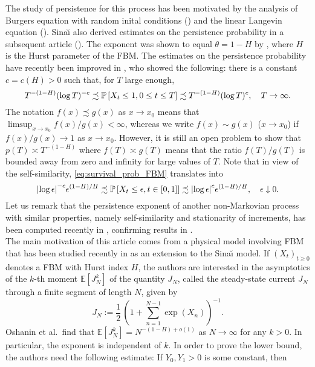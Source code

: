 \documentclass[11pt]{article}
\theoremstyle{plain}
\theoremstyle{definition}
\begin{document}
The study of persistence for this process has been motivated by the analysis of Burgers equation with random inital conditions (\cite{sinai:1992-a}) and the linear Langevin equation (\cite{krug-et-al:1997}). Sina{\u\i} also derived estimates on the persistence probability in a subsequent article (\cite{sinai:1997}). The exponent was shown to equal $\theta = 1 - H$ by \cite{molchan:1999a}, where $H$ is the Hurst parameter of the FBM. The estimates on the persistence probability have recently been improved in \cite{aurzada:2011}, who showed the following: there is a constant $c = c(H) > 0$ such that, for $T$ large enough,
\begin{equation}\label{eq:survival_prob_FBM}
   T^{-(1-H)} (\log T)^{-c} \precsim {{{\bf {\mathbb{P}}}}\left[{X_t \le 1, 0 \le t \le T}\right]} \precsim T^{-(1-H)} (\log T)^{c}, \quad T \to \infty.
\end{equation}
The notation $f(x) \precsim g(x)$ as $x \to x_0$ means that $\limsup_{x \to x_0} f(x)/g(x) < \infty$, whereas we write $f(x) \sim g(x)$ ($x \to x_0$) if $f(x)/g(x) \to 1$ as $x \to x_0$. However, it is still an open problem to show that $p(T) \asymp T^{-(1-H)}$ where $f(T) \asymp g(T)$ means that the ratio $f(T)/g(T)$ is bounded away from zero and infinity for large values of $T$. Note that in view of the self-similarity, \eqref{eq:survival_prob_FBM} translates into
\begin{equation}\label{eq:small_value_max_FBM}
   {\lvert{\log \epsilon}\rvert}^{-c} \epsilon^{(1 - H)/H} \precsim {{{\bf {\mathbb{P}}}}\left[{X_t \le \epsilon, t \in [0,1]}\right]} \precsim {\lvert{\log \epsilon}\rvert}^{c} \epsilon^{(1 - H)/H}, \quad \epsilon \downarrow 0.
\end{equation}
Let us remark that the persistence exponent of another non-Markovian process with similar properties, namely self-similarity and stationarity of increments, has been computed recently in \cite{castell-et-al:2012}, confirming results in \cite{redner:1997,majumdar:2003}.\\
The main motivation of this article comes from a physical model involving FBM that has been studied recently in \cite{o-r-s:2012} as an extension to the Sina{\u\i} model. If $(X_t)_{t \ge 0}$ denotes a FBM with Hurst index $H$, the authors are interested in the asymptotics of the $k$-th moment ${\mathbb{E}\left[{J_N^k}\right]}$ of the quantity $J_N$, called the steady-state current $J_N$ through a finite segment of length $N$, given by
\[
   J_N := \frac{1}{2} \, \left( 1+ \sum_{n=1}^{N-1} \exp(X_n) \right)^{-1}.
\]
Oshanin et al.\ find that ${\mathbb{E}\left[{J_N^k}\right]} = N^{-(1-H) + o(1)}$ as $N \to \infty$ for any $k > 0$. In particular, the exponent is independent of $k$. In order to prove the lower bound, the authors need the following estimate: If $Y_0,Y_1 > 0$ is some constant, then
\end{document}
